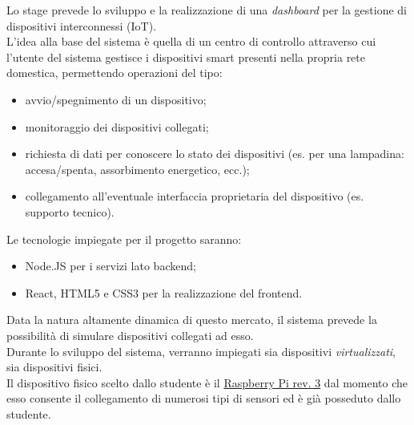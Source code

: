 \documentclass[a4paper]{article}
\begin{document}
Lo stage prevede lo sviluppo e la realizzazione di una \textit{dashboard} per la gestione di dispositivi interconnessi (IoT).\\
L'idea alla base del sistema è quella di un centro di controllo attraverso cui l'utente del sistema gestisce i dispositivi smart presenti nella propria rete domestica, permettendo operazioni del tipo:
\begin{itemize}
	\item avvio/spegnimento di un dispositivo;
	\item monitoraggio dei dispositivi collegati;
	\item richiesta di dati per conoscere lo stato dei dispositivi (es. per una lampadina: accesa/spenta, assorbimento energetico, ecc.);
	\item collegamento all'eventuale interfaccia proprietaria del dispositivo (es. supporto tecnico).
\end{itemize}
Le tecnologie impiegate per il progetto saranno:
\begin{itemize}
	\item Node.JS per i servizi lato backend;
	\item React, HTML5 e CSS3 per la realizzazione del frontend.
\end{itemize}
Data la natura altamente dinamica di questo mercato, il sistema prevede la possibilità di simulare dispositivi collegati ad esso.\\
Durante lo sviluppo del sistema, verranno impiegati sia dispositivi \textit{virtualizzati}, sia dispositivi fisici.\\
Il dispositivo fisico scelto dallo studente è il \href{https://www.raspberrypi.org/}{Raspberry Pi rev. 3} dal momento che esso consente il collegamento di numerosi tipi di sensori ed è già posseduto dallo studente.


\clearpage
\end{document}
